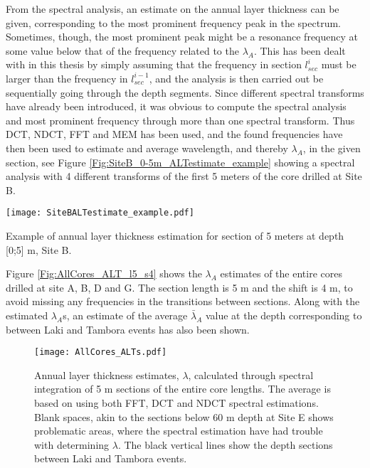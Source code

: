 \documentclass[../../CompleteThesis2/Complete_2ndDraft]{subfiles}
\begin{document}
From the spectral analysis, an estimate on the annual layer thickness can be given, corresponding to the most prominent frequency peak in the spectrum. Sometimes, though, the most prominent peak might be a resonance frequency at some value below that of the frequency related to the $\lambda_A$. This has been dealt with in this thesis by simply assuming that the frequency in section $l_{sec}^i$ must be larger than the frequency in $l_{sec}^{i-1}$, and the analysis is then carried out be sequentially going through the depth segments. Since different spectral transforms have already been introduced, it was obvious to compute the spectral analysis and most prominent frequency through more than one spectral transform. Thus DCT, NDCT, FFT and MEM has been used, and the found frequencies have then been used to estimate and average wavelength, and thereby $\lambda_A$, in the given section, see Figure \ref{Fig:SiteB_0-5m_ALTestimate_example} showing a spectral analysis with 4 different transforms of the first 5 meters of the core drilled at Site B.

\begin{marginfigure}
	\centering
	\texttt{[image: SiteBALTestimate\_example.pdf]}
	\caption[$\lambda$ estimation example, Site B, in frequency domain.]{\footnotesize Example of annual layer thickness estimation for section of 5 meters at depth [0;5] m, Site B.}
	\label{Fig:SiteB_0-5m_ALTestimate_example}
\end{marginfigure}
%

Figure \ref{Fig:AllCores_ALT_l5_s4} shows the $\lambda_A$ estimates of the entire cores drilled at site A, B, D and G. The section length is 5 m and the shift is 4 m, to avoid missing any frequencies in the transitions between sections. Along with the estimated $\lambda_A$s, an estimate of the average $\bar{\lambda}_A$ value at the depth corresponding to between Laki and Tambora events has also been shown. 


\begin{figure}[h]
	\centering
	\texttt{[image: AllCores\_ALTs.pdf]}
	\caption[$\lambda$ for Full Cores]{\small Annual layer thickness estimates, $\lambda$, calculated through spectral integration of 5 m sections of the entire core lengths. The average is based on using both FFT, DCT and NDCT spectral estimations. Blank spaces, akin to the sections below 60 m depth at Site E shows problematic areas, where the spectral estimation have had trouble with determining $\lambda$. The black vertical lines show the depth sections between Laki and Tambora events.}
	\label{fig:AllCores_ALT_l5_s4}
\end{figure}
\end{document}

